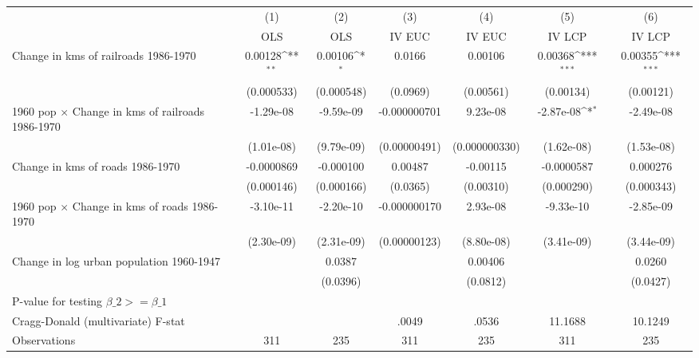 {
\def\sym#1{\ifmmode^{#1}\else\(^{#1}\)\fi}
\begin{tabular}{l*{6}{c}}
\hline\hline
                &\multicolumn{1}{c}{(1)}&\multicolumn{1}{c}{(2)}&\multicolumn{1}{c}{(3)}&\multicolumn{1}{c}{(4)}&\multicolumn{1}{c}{(5)}&\multicolumn{1}{c}{(6)}\\
                &\multicolumn{1}{c}{OLS}&\multicolumn{1}{c}{OLS}&\multicolumn{1}{c}{IV EUC}&\multicolumn{1}{c}{IV EUC}&\multicolumn{1}{c}{IV LCP}&\multicolumn{1}{c}{IV LCP}\\
\hline
Change in kms of railroads 1986-1970&  0.00128\sym{**} &  0.00106\sym{*}  &   0.0166         &  0.00106         &  0.00368\sym{***}&  0.00355\sym{***}\\
                &(0.000533)         &(0.000548)         & (0.0969)         &(0.00561)         &(0.00134)         &(0.00121)         \\
[1em]
1960 pop $\times$ Change in kms of railroads 1986-1970&-1.29e-08         &-9.59e-09         &-0.000000701         & 9.23e-08         &-2.87e-08\sym{*}  &-2.49e-08         \\
                &(1.01e-08)         &(9.79e-09)         &(0.00000491)         &(0.000000330)         &(1.62e-08)         &(1.53e-08)         \\
[1em]
Change in kms of roads 1986-1970&-0.0000869         &-0.000100         &  0.00487         & -0.00115         &-0.0000587         & 0.000276         \\
                &(0.000146)         &(0.000166)         & (0.0365)         &(0.00310)         &(0.000290)         &(0.000343)         \\
[1em]
1960 pop $\times$ Change in kms of roads 1986-1970&-3.10e-11         &-2.20e-10         &-0.000000170         & 2.93e-08         &-9.33e-10         &-2.85e-09         \\
                &(2.30e-09)         &(2.31e-09)         &(0.00000123)         &(8.80e-08)         &(3.41e-09)         &(3.44e-09)         \\
[1em]
Change in log urban population 1960-1947&                  &   0.0387         &                  &  0.00406         &                  &   0.0260         \\
                &                  & (0.0396)         &                  & (0.0812)         &                  & (0.0427)         \\
\hline
P-value for testing $\beta\_{2} >= \beta\_{1}$&                  &                  &                  &                  &                  &                  \\
Cragg-Donald (multivariate) F-stat&                  &                  &    .0049         &    .0536         &  11.1688         &  10.1249         \\
Observations    &      311         &      235         &      311         &      235         &      311         &      235         \\
\hline\hline
\end{tabular}
}
